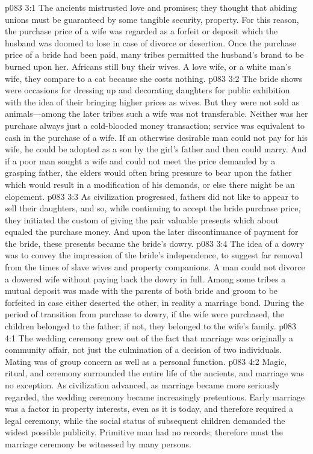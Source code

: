 \vs p083 3:1 The ancients mistrusted love and promises; they thought that abiding unions must be guaranteed by some tangible security, property. For this reason, the purchase price of a wife was regarded as a forfeit or deposit which the husband was doomed to lose in case of divorce or desertion. Once the purchase price of a bride had been paid, many tribes permitted the husband’s brand to be burned upon her. Africans still buy their wives. A love wife, or a white man’s wife, they compare to a cat because she costs nothing.
\vs p083 3:2 The bride shows were occasions for dressing up and decorating daughters for public exhibition with the idea of their bringing higher prices as wives. But they were not sold as animals---among the later tribes such a wife was not transferable. Neither was her purchase always just a cold\hyp{}blooded money transaction; service was equivalent to cash in the purchase of a wife. If an otherwise desirable man could not pay for his wife, he could be adopted as a son by the girl’s father and then could marry. And if a poor man sought a wife and could not meet the price demanded by a grasping father, the elders would often bring pressure to bear upon the father which would result in a modification of his demands, or else there might be an elopement.
\vs p083 3:3 As civilization progressed, fathers did not like to appear to sell their daughters, and so, while continuing to accept the bride purchase price, they initiated the custom of giving the pair valuable presents which about equaled the purchase money. And upon the later discontinuance of payment for the bride, these presents became the bride’s dowry.
\vs p083 3:4 The idea of a dowry was to convey the impression of the bride’s independence, to suggest far removal from the times of slave wives and property companions. A man could not divorce a dowered wife without paying back the dowry in full. Among some tribes a mutual deposit was made with the parents of both bride and groom to be forfeited in case either deserted the other, in reality a marriage bond. During the period of transition from purchase to dowry, if the wife were purchased, the children belonged to the father; if not, they belonged to the wife’s family.
\vs p083 4:1 The wedding ceremony grew out of the fact that marriage was originally a community affair, not just the culmination of a decision of two individuals. Mating was of group concern as well as a personal function.
\pc \vs p083 4:2 Magic, ritual, and ceremony surrounded the entire life of the ancients, and marriage was no exception. As civilization advanced, as marriage became more seriously regarded, the wedding ceremony became increasingly pretentious. Early marriage was a factor in property interests, even as it is today, and therefore required a legal ceremony, while the social status of subsequent children demanded the widest possible publicity. Primitive man had no records; therefore must the marriage ceremony be witnessed by many persons.
